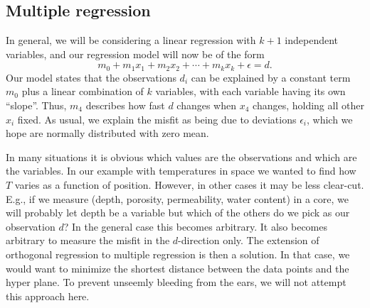 \subsection{Multiple regression}
\label{sec:mregexample}
In general, we will be considering a linear regression 
with $k+1$ independent variables, and our regression model will now be of the form
\begin{equation}
m_0 + m_1 x_1 +  m_2 x_2 + \cdots + m_k x_k + \epsilon = d.
 \end{equation}	 	
Our model states that the observations $d_i$ can be explained by a constant term $m_0$ plus a linear 
combination of $k$ variables, with each variable having its own ``slope''.  Thus, $m_4$ describes how 
fast $d$ changes when $x_4$ changes, holding all other $x_i$ fixed.  As usual, we explain the misfit as 
being due to deviations $\epsilon_i$, which we hope are normally distributed with zero mean.
	
In many situations it is obvious which values are the observations and which are the 
variables.  In our example with temperatures in space we wanted to  find how $T$ varies as a 
function of position.  However, in other cases it may be less clear-cut.  E.g., if we measure (depth, 
porosity, permeability, water content) in a core, we will probably let depth be a variable but which 
of the others do we pick as our observation $d$?  In the general case this becomes arbitrary.  It also becomes 
arbitrary to measure the misfit in the $d$-direction only.  The extension of orthogonal regression to 
multiple regression is then a solution. In that case, we would want to minimize the shortest distance 
between the data points and the hyper plane.  To prevent unseemly bleeding from the ears, we will not attempt this approach here.
	
